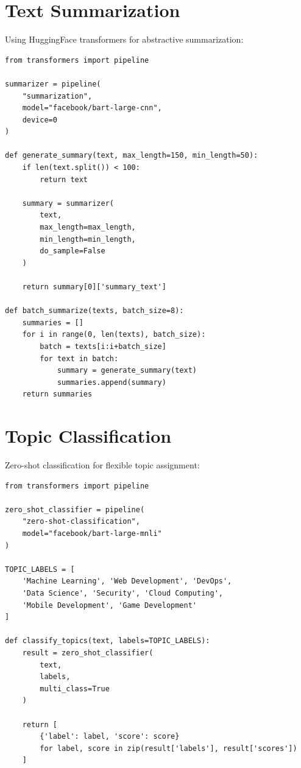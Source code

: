 \documentclass[12pt,a4paper]{report}
\begin{document}
\section{Text Summarization}

Using HuggingFace transformers for abstractive summarization:

\begin{lstlisting}
from transformers import pipeline

summarizer = pipeline(
    "summarization",
    model="facebook/bart-large-cnn",
    device=0
)

def generate_summary(text, max_length=150, min_length=50):
    if len(text.split()) < 100:
        return text
    
    summary = summarizer(
        text,
        max_length=max_length,
        min_length=min_length,
        do_sample=False
    )
    
    return summary[0]['summary_text']

def batch_summarize(texts, batch_size=8):
    summaries = []
    for i in range(0, len(texts), batch_size):
        batch = texts[i:i+batch_size]
        for text in batch:
            summary = generate_summary(text)
            summaries.append(summary)
    return summaries
\end{lstlisting}

\section{Topic Classification}

Zero-shot classification for flexible topic assignment:

\begin{lstlisting}
from transformers import pipeline

zero_shot_classifier = pipeline(
    "zero-shot-classification",
    model="facebook/bart-large-mnli"
)

TOPIC_LABELS = [
    'Machine Learning', 'Web Development', 'DevOps',
    'Data Science', 'Security', 'Cloud Computing',
    'Mobile Development', 'Game Development'
]

def classify_topics(text, labels=TOPIC_LABELS):
    result = zero_shot_classifier(
        text,
        labels,
        multi_class=True
    )
    
    return [
        {'label': label, 'score': score}
        for label, score in zip(result['labels'], result['scores'])
    ]
\end{lstlisting}
\end{document}
